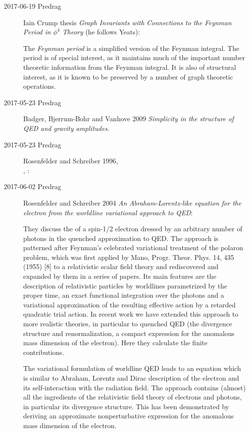 \begin{description}
\item[2017-06-19 Predrag]
Iain Crump
{thesis} {\em Graph Invariants with Connections to the
Feynman Period in $\phi^4$ Theory} (he follows Yeats):

The \emph{Feynman period} is a simplified version of the Feynman integral. The
period is of special interest, as it maintains much of the important
number theoretic information from the Feynman integral. It is also of
structural interest, as it is known to be preserved by a number of graph
theoretic operations.


\item[2017-05-23 Predrag]
Badger, Bjerrum-Bohr and Vanhove 2009
{\em Simplicity in the structure of {QED} and gravity amplitudes}.

\item[2017-05-23 Predrag]
Rosenfelder and Schreiber 1996,
\\
, :

\item[2017-06-02 Predrag]
Rosenfelder and Schreiber 2004
{\em An {Abraham-Lorentz-}like equation for the electron from the
worldline variational approach to {QED}}:

They discuss the of a spin-1/2 electron dressed by an arbitrary number of
photons in the quenched approximation to QED. The approach is patterned
after Feynman's celebrated variational treatment of the polaron
problem, which was first applied by Mano, Progr. Theor.
Phys. 14, 435 (1955) [8] to a relativistic  scalar  field  theory  and
rediscovered  and  expanded by them in a series of
papers. Its main features are the description of
relativistic particles by worldlines parametrized by the
proper time, an exact functional integration over the photons and a
variational approximation of the resulting effective action by a retarded
quadratic trial action. In recent work we have extended this approach to
more realistic theories, in particular to quenched QED (the
divergence structure and renormalization, a compact expression for the
anomalous mass dimension of the electron). Here they calculate the finite
contributions.

The variational formulation of worldline QED leads to an equation which
is similar to Abraham, Lorentz and Dirac description of the electron and
its self-interaction with the radiation field. The approach contains
(almost) all the ingredients of the relativistic field theory of
electrons and photons, in particular its divergence structure. This has
been demonstrated by deriving an approximate nonperturbative expression
for the anomalous mass dimension of the electron.


\end{description}

